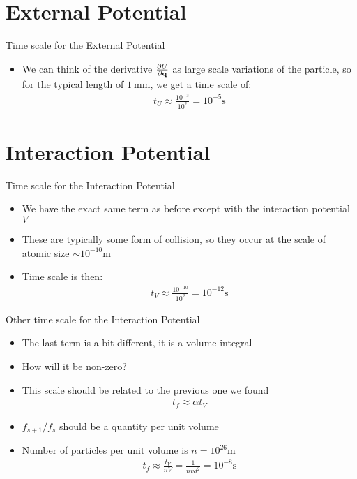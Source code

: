 \documentclass{beamer}
\begin{document}
\section{External Potential}
\begin{frame}{Time scale for the External Potential}
  \begin{itemize}
  \item We can think of the derivative $\pdv{U}{\vb{q}}$ as large scale variations of the particle, so for the typical length of $\SI{1}{\mm}$, we get a time scale of:
    \begin{align*}
      t_U\approx\frac{10^{-3}}{10^2}= 10^{-5}\unit{\s}
    \end{align*}
  \end{itemize}
\end{frame}

\section{Interaction Potential}
\begin{frame}{Time scale for the Interaction Potential}
  \begin{itemize}
  \item We have the exact same term as before except with the interaction potential $V$
  \item These are typically some form of collision, so they occur at the scale of atomic size $\sim10^{-10}\unit{\m}$
  \item Time scale is then:
    \begin{align*}
      t_V\approx\frac{10^{-10}}{10^2}= 10^{-12}\unit{\s}
    \end{align*}
  \end{itemize}
\end{frame}
\begin{frame}{Other time scale for the Interaction Potential}
  \begin{itemize}
  \item The last term is a bit different, it is a volume integral
  \item How will it be non-zero?
  \item This scale should be related to the previous one we found
    \begin{align*}
      t_f\approx\alpha t_V
    \end{align*}
  \item $f_{s+1}/f_s$ should be a quantity per unit volume
  \item Number of particles per unit volume is $n=10^{26}\unit{\m}$
    \begin{align*}
      t_f\approx\frac{t_V}{nV}=\frac{1}{nvd^2}= 10^{-8}\unit{\s}
    \end{align*}
  \end{itemize}
\end{frame}
\end{document}
